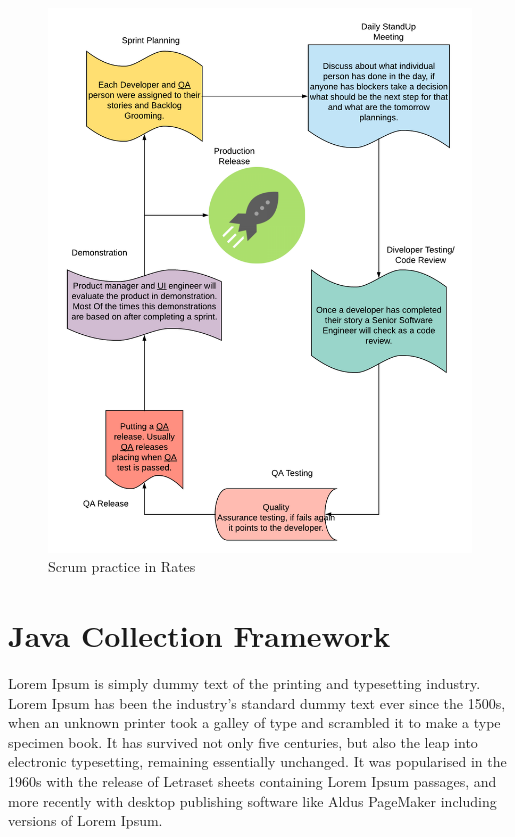 \documentclass[12pt,a4paper]{report}
\begin{document}
\begin{figure}[H]
\includegraphics[scale=.8]{Scrum.png}
  \caption{Scrum practice in Rates}
  \label{fig:Scrum}
\end{figure}




\section{Java Collection Framework}

Lorem Ipsum is simply dummy text of the printing and typesetting industry. Lorem Ipsum has been the industry's standard dummy text ever since the 1500s, when an unknown printer took a galley of type and scrambled it to make a type specimen book. It has survived not only five centuries, but also the leap into electronic typesetting, remaining essentially unchanged. It was popularised in the 1960s with the release of Letraset sheets containing Lorem Ipsum passages, and more recently with desktop publishing software like Aldus PageMaker including versions of Lorem Ipsum.
\end{document}
